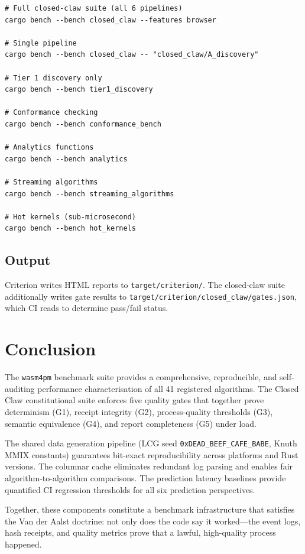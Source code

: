 \documentclass[11pt,a4paper]{article}
\begin{document}
\begin{lstlisting}[caption={Benchmark invocation examples}]
# Full closed-claw suite (all 6 pipelines)
cargo bench --bench closed_claw --features browser

# Single pipeline
cargo bench --bench closed_claw -- "closed_claw/A_discovery"

# Tier 1 discovery only
cargo bench --bench tier1_discovery

# Conformance checking
cargo bench --bench conformance_bench

# Analytics functions
cargo bench --bench analytics

# Streaming algorithms
cargo bench --bench streaming_algorithms

# Hot kernels (sub-microsecond)
cargo bench --bench hot_kernels
\end{lstlisting}

\subsection{Output}

Criterion writes HTML reports to \texttt{target/criterion/}.
The closed-claw suite additionally writes gate results to
\texttt{target/criterion/closed\_claw/gates.json}, which CI reads to
determine pass/fail status.

\section{Conclusion}
\label{sec:conclusion}

The \texttt{wasm4pm} benchmark suite provides a comprehensive, reproducible,
and self-auditing performance characterisation of all 41 registered
algorithms. The Closed Claw constitutional suite enforces five quality
gates that together prove determinism (G1), receipt integrity (G2),
process-quality thresholds (G3), semantic equivalence (G4), and report
completeness (G5) under load.

The shared data generation pipeline (LCG seed \texttt{0xDEAD\_BEEF\_CAFE\_BABE},
Knuth MMIX constants) guarantees bit-exact reproducibility across platforms
and Rust versions. The columnar cache eliminates redundant log parsing and
enables fair algorithm-to-algorithm comparisons. The prediction latency
baselines provide quantified CI regression thresholds for all six
prediction perspectives.

Together, these components constitute a benchmark infrastructure that
satisfies the Van der Aalst doctrine: not only does the code say it
worked---the event logs, hash receipts, and quality metrics prove that
a lawful, high-quality process happened.
\end{document}
